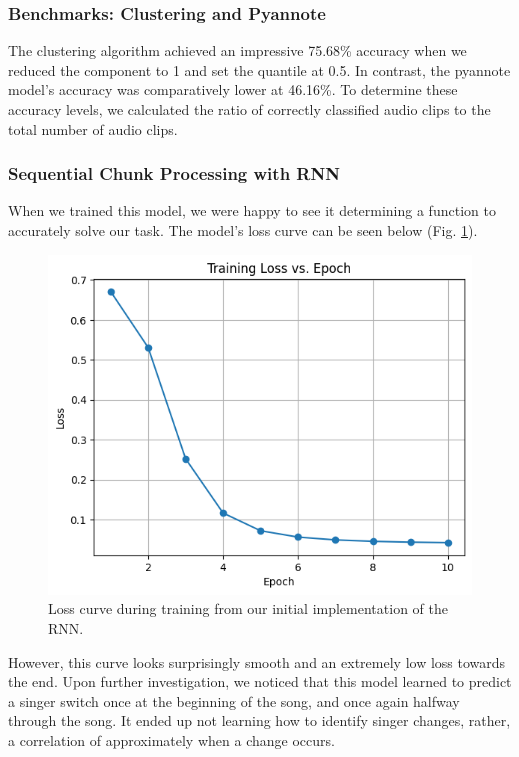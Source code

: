 \documentclass[conference]{IEEEtran}
\begin{document}
    \subsubsection{Benchmarks: Clustering and Pyannote}
    The clustering algorithm achieved an impressive 75.68\% accuracy when we reduced the component to 1 and set the quantile at 0.5. In contrast, the pyannote model's accuracy was comparatively lower at 46.16\%. To determine these accuracy levels, we calculated the ratio of correctly classified audio clips to the total number of audio clips.

    \subsubsection{Sequential Chunk Processing with RNN}

    When we trained this model, we were happy to see it determining a function to accurately solve our task. The model's loss curve can be seen below (Fig. \ref{fig:rnn_loss_v1}).

    \begin{figure}[ht]
        \centering
        \includegraphics[scale=0.5]{RNN_Loss_v1.png}
        \caption{Loss curve during training from our initial implementation of the RNN.}
        \label{fig:rnn_loss_v1}
    \end{figure}
    
    However, this curve looks surprisingly smooth and an extremely low loss towards the end. Upon further investigation, we noticed that this model learned to predict a singer switch once at the beginning of the song, and once again halfway through the song. It ended up not learning how to identify singer changes, rather, a correlation of approximately when a change occurs.
    
\end{document}
